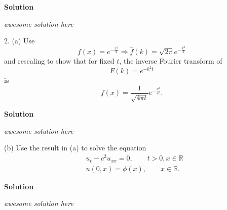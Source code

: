 \documentclass{article}
\begin{document}
\textbf{Solution}

\textit{awesome solution here}

\newpage

2. (a) Use
%
\begin{equation*}
    f(x) = e^{- \frac{x^2}{2}} \Rightarrow \widehat{f}(k) = \sqrt{2 \pi} e^{- \frac{k^2}{2}}
\end{equation*}
%
and rescaling to show that for fixed $t$, the inverse Fourier transform of
%
\begin{equation*}
    F(k) = e^{- k^2 t}
\end{equation*}
%
is
%
\begin{equation*}
    f(x) = \frac{1}{\sqrt{4 \pi t}} e^{- \frac{x^2}{4 t}}
    .
\end{equation*}

\textbf{Solution}

\textit{awesome solution here}

\vspace{5mm}

(b) Use the result in (a) to solve the equation
%
\begin{align*}
    &u_t - c^2 u_{x x} = 0, \quad \quad t > 0, x \in \mathbb{R} \\
    &u(0, x) = \phi(x), \quad \quad x \in \mathbb{R}
    .
\end{align*}

\textbf{Solution}

\textit{awesome solution here}
\end{document}
